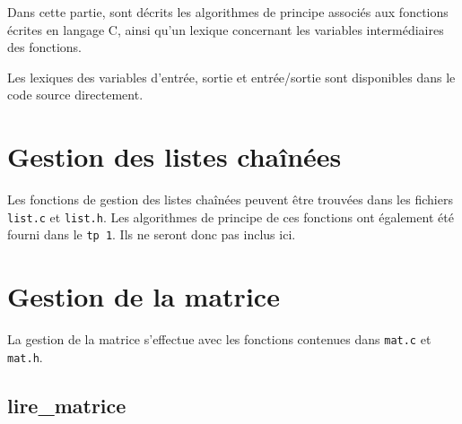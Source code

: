 Dans cette partie, sont décrits les algorithmes de principe associés aux fonctions écrites en langage C, ainsi qu'un lexique concernant les variables intermédiaires des fonctions.

Les lexiques des variables d'entrée, sortie et entrée/sortie sont disponibles dans le code source directement.

\section{Gestion des listes chaînées}
  Les fonctions de gestion des listes chaînées peuvent être trouvées dans les fichiers \texttt{list.c} et \texttt{list.h}.
  Les algorithmes de principe de ces fonctions ont également été fourni dans le \texttt{tp 1}. Ils ne seront donc pas inclus ici.

\section{Gestion de la matrice}
  La gestion de la matrice s'effectue avec les fonctions contenues dans \texttt{mat.c} et \texttt{mat.h}.
    
  \newpage
\subsection{lire\_matrice}
  \begin{algo}[informal] %
    \BEGIN
          \ENDIF
        \ENDWHILE
      \ELSE
      \ENDIF
    \END
  \end{algo}
  
  \begin{algo}[informal] %
    \VAR
    \ENDVAR
  \end{algo}
  

